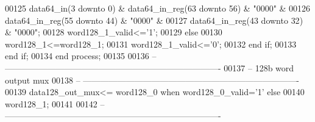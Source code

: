 \begin{DoxyCode}
00125                            \textcolor{vhdlchar}{data64_in}\textcolor{vhdlchar}{(}\textcolor{vhdllogic}{}\textcolor{vhdllogic}{3} \textcolor{keywordflow}{downto} \textcolor{vhdllogic}{}\textcolor{vhdllogic}{0}\textcolor{vhdlchar}{)} \textcolor{vhdlchar}{&} \textcolor{vhdlchar}{data64_in_reg}\textcolor{vhdlchar}{(}\textcolor{vhdllogic}{}\textcolor{vhdllogic}{63} \textcolor{keywordflow}{downto} \textcolor{vhdllogic}{}\textcolor{vhdllogic}{56}\textcolor{vhdlchar}{)} \textcolor{vhdlchar}{&} \textcolor{vhdllogic}{"0000"} \textcolor{vhdlchar}{&}
00126                            \textcolor{vhdlchar}{data64_in_reg}\textcolor{vhdlchar}{(}\textcolor{vhdllogic}{}\textcolor{vhdllogic}{55} \textcolor{keywordflow}{downto} \textcolor{vhdllogic}{}\textcolor{vhdllogic}{44}\textcolor{vhdlchar}{)} \textcolor{vhdlchar}{&} \textcolor{vhdllogic}{"0000"} \textcolor{vhdlchar}{&} 
00127                            \textcolor{vhdlchar}{data64_in_reg}\textcolor{vhdlchar}{(}\textcolor{vhdllogic}{}\textcolor{vhdllogic}{43} \textcolor{keywordflow}{downto} \textcolor{vhdllogic}{}\textcolor{vhdllogic}{32}\textcolor{vhdlchar}{)} \textcolor{vhdlchar}{&} \textcolor{vhdllogic}{"0000"};                   
00128             \textcolor{vhdlchar}{word128_1_valid}\textcolor{vhdlchar}{<=}\textcolor{vhdlchar}{'}\textcolor{vhdllogic}{}\textcolor{vhdllogic}{1}\textcolor{vhdlchar}{'};
00129             \textcolor{keywordflow}{else} 
00130                 \textcolor{vhdlchar}{word128_1}\textcolor{vhdlchar}{<=}\textcolor{vhdlchar}{word128_1};
00131             \textcolor{vhdlchar}{word128_1_valid}\textcolor{vhdlchar}{<=}\textcolor{vhdlchar}{'}\textcolor{vhdllogic}{}\textcolor{vhdllogic}{0}\textcolor{vhdlchar}{'};
00132             \textcolor{keywordflow}{end} \textcolor{keywordflow}{if};
00133         \textcolor{keywordflow}{end} \textcolor{keywordflow}{if};
00134     \textcolor{keywordflow}{end} \textcolor{keywordflow}{process};
00135     
00136 \textcolor{keyword}{-- ----------------------------------------------------------------------------}
00137 \textcolor{keyword}{-- 128b word output mux}
00138 \textcolor{keyword}{-- ----------------------------------------------------------------------------}
00139 \textcolor{vhdlchar}{data128_out_mux}\textcolor{vhdlchar}{<=}   \textcolor{vhdlchar}{word128_0} \textcolor{keywordflow}{when} \textcolor{vhdlchar}{word128_0_valid}\textcolor{vhdlchar}{=}\textcolor{vhdlchar}{'}\textcolor{vhdllogic}{}\textcolor{vhdllogic}{1}\textcolor{vhdlchar}{'} \textcolor{keywordflow}{else} 
00140                   \textcolor{vhdlchar}{word128_1};
00141 
00142 \textcolor{keyword}{-- ----------------------------------------------------------------------------}

\end{DoxyCode}
